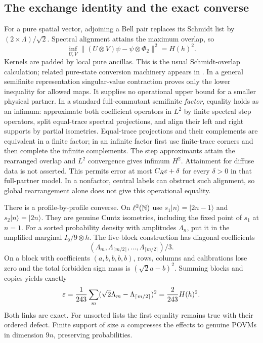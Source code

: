 \subsection{The exchange identity and the exact converse}
For a pure spatial vector, adjoining a Bell pair replaces its Schmidt list by $(2\mathbin{\times}\Lambda)/\sqrt2$. Spectral alignment attains the maximum overlap, so
\begin{equation}\label{eq:exchange}
 \inf_{U,V}\|(U\otimes V)\psi-\psi\otimes\Phi_2\|^2=H(h)^2.
\end{equation}
Kernels are padded by local pure ancillas. This is the usual Schmidt-overlap calculation; related pure-state conversion machinery appears in \cite{ZTG}. In a general semifinite representation singular-value contraction proves only the lower inequality for allowed maps. It supplies no operational upper bound for a smaller physical partner. In a standard full-commutant semifinite \emph{factor}, equality holds as an infimum: approximate both coefficient operators in $L^2$ by finite spectral step operators, split equal-trace spectral projections, and align their left and right supports by partial isometries. Equal-trace projections and their complements are equivalent in a finite factor; in an infinite factor first use finite-trace corners and then complete the infinite complements. The step approximants attain the rearranged overlap and $L^2$ convergence gives infimum $H^2$. Attainment for diffuse data is not asserted. This permits error at most $C_R\varepsilon+\delta$ for every $\delta>0$ in that full-partner model. In a nonfactor, central labels can obstruct such alignment, so global rearrangement alone does not give this operational equality.

There is a profile-by-profile converse. On $\ell^2(\mathbb N)$ use $s_1|n\rangle=|2n-1\rangle$ and $s_2|n\rangle=|2n\rangle$. They are genuine Cuntz isometries, including the fixed point of $s_1$ at $n=1$. For a sorted probability density with amplitudes $\Lambda_n$, put it in the amplified marginal $I_9/9\otimes h$. The five-block construction has diagonal coefficients
\[
 (\Lambda_m,\Lambda_{\lceil m/2\rceil},\ldots,
                 \Lambda_{\lceil m/2\rceil})/3.
\]
On a block with coefficients $(a,b,b,b,b)$, rows, columns and calibrations lose zero and the total forbidden sign mass is $(\sqrt2a-b)^2$. Summing blocks and copies yields exactly
\begin{equation}\label{eq:converse}
 \varepsilon=\frac1{243}\sum_m(\sqrt2\Lambda_m-\Lambda_{\lceil m/2\rceil})^2
      =\frac2{243}H(h)^2.
\end{equation}
Both links are exact. For unsorted lists the first equality remains true with their ordered defect. Finite support of size $n$ compresses the effects to genuine POVMs in dimension $9n$, preserving probabilities.

